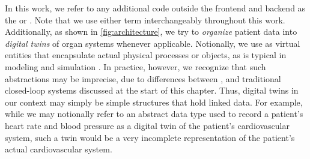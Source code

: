 In this work, we refer to any additional code outside the frontend and
backend as the  or .
Note that we use either term interchangeably throughout this work.
Additionally, as shown in \autoref{fig:architecture},
we try to \emph{organize} patient
data into \emph{digital twins} of organ systems whenever applicable.
Notionally, we use  as virtual entities that encapsulate
actual physical processes or objects,
as is typical in modeling and simulation \cite{TaoJMS22}.
In practice, however, we recognize that such abstractions may be
imprecise, due to differences between \CDSSs{}, and traditional
closed-loop systems discussed at the start of this chapter. Thus,
digital twins in our context may simply be simple structures that
hold linked data. For example, while we may notionally refer to an abstract data type
used to record a patient's heart rate and blood pressure as a digital twin of
the patient's cardiovascular system, such a twin would be a very incomplete
representation of the patient's actual cardiovascular system.

